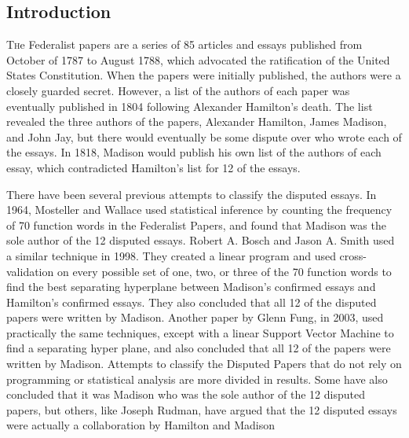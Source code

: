 \documentclass[twoside]{article}
\begin{document}
\begin{multicols}{2} %

\section{Introduction}

\lettrine[nindent=0em,lines=3]{T}he Federalist papers are a series of 85 articles and essays published from October of 1787 to August 1788, which advocated the ratification of the United States Constitution. When the papers were initially published, the authors were a closely guarded secret. However, a list of the authors of each paper was eventually published in 1804 following Alexander Hamilton's death. The list revealed the three authors of the papers, Alexander Hamilton, James Madison, and John Jay, but there would eventually be some dispute over who wrote each of the essays. In 1818, Madison would publish his own list of the authors of each essay, which contradicted Hamilton's list for 12 of the essays.

There have been several previous attempts to classify the disputed essays. In 1964, Mosteller and Wallace used statistical inference by counting the frequency of 70 function words in the Federalist Papers, and found that Madison was the sole author of the 12 disputed essays. Robert A. Bosch and Jason A. Smith used a similar technique in 1998. They created a linear program and used cross-validation on every possible set of one, two, or three of the 70 function words to find the best separating hyperplane between Madison's confirmed essays and Hamilton's confirmed essays. They also concluded that all 12 of the disputed papers were written by Madison. Another paper by Glenn Fung, in 2003, used practically the same techniques, except with a linear Support Vector Machine to find a separating hyper plane, and also concluded that all 12 of the papers were written by Madison. Attempts to classify the Disputed Papers that do not rely on programming or statistical analysis are more divided in results. Some have also concluded that it was Madison who was the sole author of the 12 disputed papers, but others, like Joseph Rudman, have argued that the 12 disputed essays were actually a collaboration by Hamilton and Madison



\end{multicols}
\end{document}
